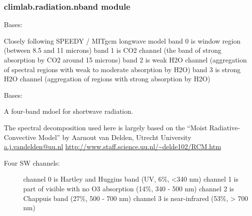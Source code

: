 \documentclass[letterpaper,10pt,english]{sphinxmanual}
\begin{document}
\subsubsection{climlab.radiation.nband module}
\label{api/climlab.radiation:climlab-radiation-nband-module}\label{api/climlab.radiation:module-climlab.radiation.nband}

\begin{fulllineitems}
\label{api/climlab.radiation:climlab.radiation.nband.FourBandLW}
Bases: {\hyperref[api/climlab.radiation:climlab.radiation.nband.NbandRadiation]{\emph{}}}

Closely following SPEEDY / MITgcm longwave model
band 0 is window region (between 8.5 and 11 microns)
band 1 is CO2 channel (the band of strong absorption by CO2 around 15 microns)
band 2 is weak H2O channel (aggregation of spectral regions with weak to moderate absorption by H2O)
band 3 is strong H2O channel (aggregation of regions with strong absorption by H2O)

\end{fulllineitems}


\begin{fulllineitems}
\label{api/climlab.radiation:climlab.radiation.nband.FourBandSW}
Bases: {\hyperref[api/climlab.radiation:climlab.radiation.nband.NbandRadiation]{\emph{}}}

A four-band mdoel for shortwave radiation.

The spectral decomposition used here is largely based on the
``Moist Radiative-Convective Model'' by Aarnout van Delden, Utrecht University
\href{mailto:a.j.vandelden@uu.nl}{a.j.vandelden@uu.nl}
\href{http://www.staff.science.uu.nl/~delde102/RCM.htm}{http://www.staff.science.uu.nl/\textasciitilde{}delde102/RCM.htm}
\begin{description}
\item[{Four SW channels:}] \leavevmode
channel 0 is Hartley and Huggins band (UV, 6\%, \textless{}340 nm)
channel 1 is part of visible with no O3 absorption (14\%, 340 - 500 nm)
channel 2 is Chappuis band (27\%, 500 - 700 nm)
channel 3 is near-infrared (53\%, \textgreater{} 700 nm)

\end{description}

\begin{fulllineitems}
\label{api/climlab.radiation:climlab.radiation.nband.FourBandSW.emissivity}
\end{fulllineitems}


\end{fulllineitems}
\end{document}
